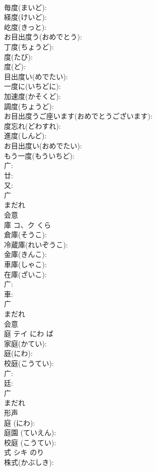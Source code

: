 \documentclass[8pt]{extreport}
\begin{document}
\begin{CJK}{UTF8}{min}
\\	毎度(まいど): 
\\	経度(けいど): 
\\	屹度(きっと): 
\\	お目出度う(おめでとう): 
\\	丁度(ちょうど): 
\\	度(たび): 
\\	度(ど): 
\\	目出度い(めでたい): 
\\	一度に(いちどに): 
\\	加速度(かそくど): 
\\	調度(ちょうど): 
\\	お目出度うご座います(おめでとうございます): 
\\	度忘れ(どわすれ): 
\\	進度(しんど): 
\\	お目出度い(おめでたい): 
\\	もう一度(もういちど): 
\\	广: 
\\	廿: 
\\	又: 
\\	广	
\\	まだれ	
\\	会意 
\\	庫	コ、ク	くら		
\\	倉庫(そうこ): 
\\	冷蔵庫(れいぞうこ): 
\\	金庫(きんこ): 
\\	車庫(しゃこ): 
\\	在庫(ざいこ): 
\\	广: 
\\	車: 
\\	广	
\\	まだれ	
\\	会意 
\\	庭	テイ	にわ	ば	
\\	家庭(かてい): 
\\	庭(にわ): 
\\	校庭(こうてい): 
\\	广: 
\\	廷: 
\\	广	
\\	まだれ	
\\	形声 
\\	庭 (にわ): 
\\	庭園 (ていえん): 
\\	校庭 (こうてい): 
\\	式	シキ		のり	
\\	株式(かぶしき): 

\end{CJK}
\end{document}
